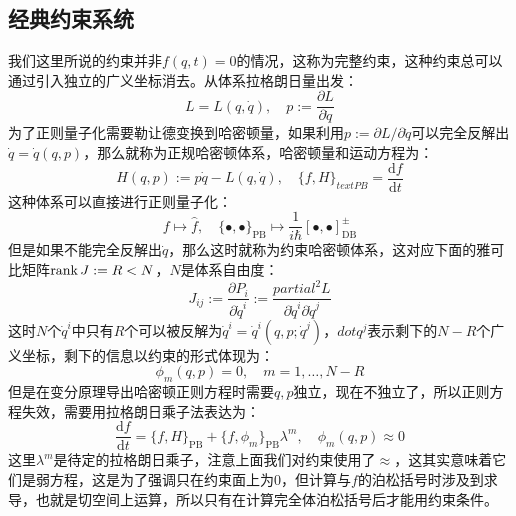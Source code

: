 \subsection{经典约束系统}
我们这里所说的约束并非$f(q,t)=0$的情况，这称为完整约束，这种约束总可以通过引入独立的广义坐标消去。从体系拉格朗日量出发：
\begin{equation}
	L=L(q,\dot q),\quad p:=\frac{\partial L}{\partial \dot q}
\end{equation}
为了正则量子化需要勒让德变换到哈密顿量，如果利用$p:={\partial L}/{\partial \dot q}$可以完全反解出$\dot q = \dot q(q,p)$，那么就称为正规哈密顿体系，哈密顿量和运动方程为：
\begin{equation}
	H(q,p) := p\dot{q}-L(q,\dot{q}),\quad \{f,H\}_{text{PB}} = \frac{\mathrm{d} f}{\mathrm{d} t}
\end{equation}
这种体系可以直接进行正则量子化：
\begin{equation}
	\label{canonical}
	f\mapsto \hat f,\quad \{\bullet,\bullet\}_{\text{PB}}\mapsto \frac{1}{i\hbar} [\bullet,\bullet]^{\pm}_{\text{DB}}
\end{equation}
但是如果不能完全反解出$\dot q$，那么这时就称为约束哈密顿体系，这对应下面的雅可比矩阵$\rank J := R<N$，$N$是体系自由度：
\begin{equation}
	J_{ij}:=\frac{\partial P_i}{\partial \dot{q}^i}:=\frac{partial^2 L}{\partial \dot{q}^i\partial \dot{q}^j}
\end{equation}
这时$N$个$\dot{q}^i$中只有$R$个可以被反解为$\dot{q}^i=\dot{q}^i(q,p;\dot{q}^j)$，$dot{q}^j$表示剩下的$N-R$个广义坐标，剩下的信息以约束的形式体现为：
\begin{equation}
	\phi_m(q,p)=0,\quad m = 1,\ldots,N-R 
\end{equation}
但是在变分原理导出哈密顿正则方程时需要$q,p$独立，现在不独立了，所以正则方程失效，需要用拉格朗日乘子法表达为：
\begin{equation}
	\frac{\mathrm{d}f}{\mathrm{d}t} = \{f,H\}_{\text{PB}}+\{f,\phi_m\}_{\text{PB}}\lambda^m,\quad 	\phi_m(q,p)\approx0
\end{equation}
这里$\lambda^m$是待定的拉格朗日乘子，注意上面我们对约束使用了$\approx$，这其实意味着它们是弱方程，这是为了强调只在约束面上为$0$，但计算与$f$的泊松括号时涉及到求导，也就是切空间上运算，所以只有在计算完全体泊松括号后才能用约束条件。

